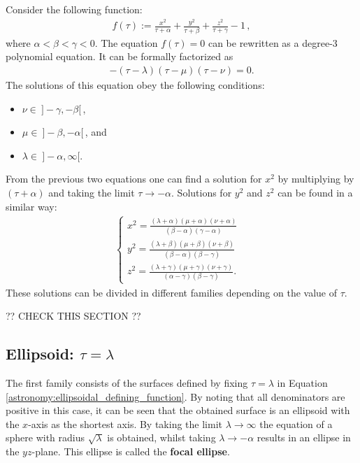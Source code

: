     Consider the following function:
    \begin{gather}
        \label{astronomy:ellipsoidal_defining_function}
        f(\tau) := \frac{x^2}{\tau + \alpha} + \frac{y^2}{\tau + \beta} + \frac{z^2}{\tau + \gamma} - 1\,,
    \end{gather}
    where $\alpha<\beta<\gamma<0$. The equation $f(\tau)=0$ can be rewritten as a degree-3 polynomial equation. It can be formally factorized as
    \begin{gather}
        -(\tau-\lambda)(\tau-\mu)(\tau-\nu) = 0.
    \end{gather}
    The solutions of this equation obey the following conditions:
    \begin{itemize}
        \item $\nu\in\ ]-\gamma,-\beta[$\,,
        \item $\mu\in\ ]-\beta,-\alpha[$\,, and
        \item $\lambda\in\ ]-\alpha,\infty[$.
    \end{itemize}
    From the previous two equations one can find a solution for $x^2$ by multiplying by $(\tau+\alpha)$ and taking the limit $\tau\rightarrow-\alpha$. Solutions for $y^2$ and $z^2$ can be found in a similar way:
    \begin{gather}
        \label{astronomy:ellipsoidal_coordinates}
        \begin{cases}
            x^2 = \frac{(\lambda + \alpha)(\mu + \alpha)(\nu + \alpha)}{(\beta - \alpha)(\gamma - \alpha)}&\\
            y^2 = \frac{(\lambda + \beta)(\mu + \beta)(\nu + \beta)}{(\beta - \alpha)(\beta - \gamma)}&\\
            z^2 = \frac{(\lambda + \gamma)(\mu + \gamma)(\nu + \gamma)}{(\alpha - \gamma)(\beta - \gamma)}.&
        \end{cases}
    \end{gather}
    These solutions can be divided in different families depending on the value of $\tau$.

    ?? CHECK THIS SECTION ??

\subsection{Ellipsoid: \texorpdfstring{$\tau=\lambda$}{tau equals lambda}}

    The first family consists of the surfaces defined by fixing $\tau=\lambda$ in Equation \eqref{astronomy:ellipsoidal_defining_function}. By noting that all denominators are positive in this case, it can be seen that the obtained surface is an ellipsoid with the $x$-axis as the shortest axis. By taking the limit $\lambda\longrightarrow\infty$ the equation of a sphere with radius $\sqrt{\lambda}$ is obtained, whilst taking $\lambda\longrightarrow-\alpha$ results in an ellipse in the $yz$-plane. This ellipse is called the \textbf{focal ellipse}.

